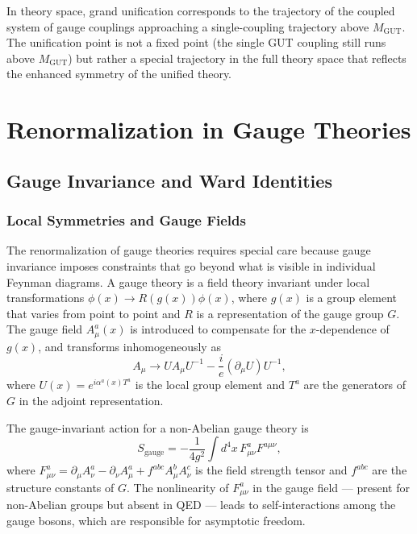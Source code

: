\documentclass[11pt, twoside, openright]{book}
\theoremstyle{dotted}
\theoremstyle{definition}
\begin{document}
In theory space, grand unification corresponds to the trajectory of the coupled
system of gauge couplings approaching a single-coupling trajectory above
$M_{\mathrm{GUT}}$. The unification point is not a fixed point (the single GUT
coupling still runs above $M_{\mathrm{GUT}}$) but rather a special trajectory in
the full theory space that reflects the enhanced symmetry of the unified theory.

\part{Renormalization in Gauge Theories}

\chapter{Gauge Invariance and Ward Identities}
\label{ch:gauge_invariance}

\section{Local Symmetries and Gauge Fields}

The renormalization of gauge theories requires special care because gauge
invariance imposes constraints that go beyond what is visible in individual Feynman
diagrams. A gauge theory is a field theory invariant under local transformations
$\phi(x) \to R(g(x))\phi(x)$, where $g(x)$ is a group element that varies from
point to point and $R$ is a representation of the gauge group $G$. The gauge field
$A_\mu^a(x)$ is introduced to compensate for the $x$-dependence of $g(x)$, and
transforms inhomogeneously as
\begin{equation}
  A_\mu \to U A_\mu U^{-1} - \frac{i}{e}(\partial_\mu U)U^{-1},
  \label{eq:gauge_transform}
\end{equation}
where $U(x) = e^{i\alpha^a(x)T^a}$ is the local group element and $T^a$ are the
generators of $G$ in the adjoint representation.

The gauge-invariant action for a non-Abelian gauge theory is
\begin{equation}
  S_{\mathrm{gauge}} = -\frac{1}{4g^2}\int d^4x \, F_{\mu\nu}^a F^{a\mu\nu},
  \label{eq:yang_mills}
\end{equation}
where $F_{\mu\nu}^a = \partial_\mu A_\nu^a - \partial_\nu A_\mu^a + f^{abc}A_\mu^b
A_\nu^c$ is the field strength tensor and $f^{abc}$ are the structure constants of
$G$. The nonlinearity of $F_{\mu\nu}^a$ in the gauge field --- present for non-Abelian
groups but absent in QED --- leads to self-interactions among the gauge bosons, which
are responsible for asymptotic freedom.
\end{document}
